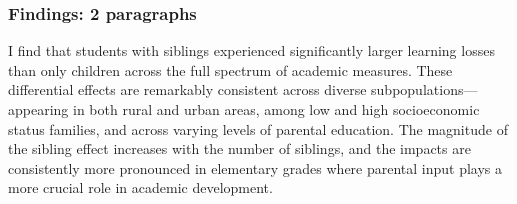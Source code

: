 


\subsubsection{Findings: 2 paragraphs}

I find that students with siblings experienced significantly larger learning losses than only children across the full spectrum of academic measures. These differential effects are remarkably consistent across diverse subpopulations—appearing in both rural and urban areas, among low and high socioeconomic status families, and across varying levels of parental education. The magnitude of the sibling effect increases with the number of siblings, and the impacts are consistently more pronounced in elementary grades where parental input plays a more crucial role in academic development.

